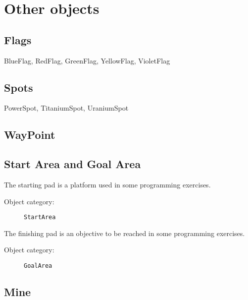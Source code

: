 
\section{Other objects}


\subsection{Flags}

BlueFlag, RedFlag, GreenFlag, YellowFlag, VioletFlag


\subsection{Spots}

PowerSpot, TitaniumSpot, UraniumSpot


\subsection{WayPoint}



\subsection{Start Area and Goal Area}

The starting pad is a platform used in some programming exercises.

\begin{description}
    \item[Object category:] \texttt{StartArea}
\end{description}

The finishing pad is an objective to be reached in some programming exercises.

\begin{description}
    \item[Object category:] \texttt{GoalArea}
\end{description}


\subsection{Mine}

